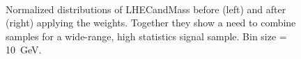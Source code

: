 \begin{figure}[htb]
\begin{center}
\\
\end{center}
\caption{Normalized distributions of LHECandMass before (left) and after (right) applying
the weights. Together they show a need to combine samples for a wide-range, high
statistics signal sample. Bin size = \SI{10}{\giga\electronvolt}.}
\label{fig:LHE_raw}
\end{figure}

